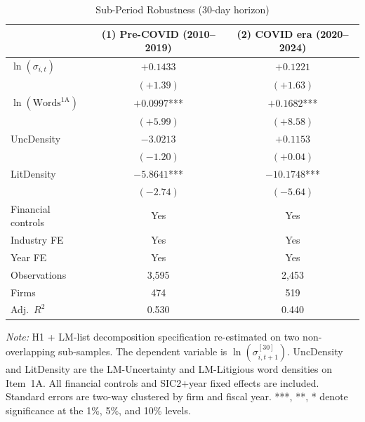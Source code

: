 \begin{table}[htbp]
\centering
\caption{Sub-Period Robustness (30-day horizon)}
\label{tab:subperiod}
\begin{tabular}{lcc}
\toprule
 & (1) Pre-COVID (2010--2019) & (2) COVID era (2020--2024) \\
\midrule
$\ln(\sigma_{i,t})$ & $+0.1433$ & $+0.1221$ \\
 & $(+1.39)$ & $(+1.63)$ \\[4pt]
$\ln(\text{Words}^{\text{1A}})$ & $+0.0997$*** & $+0.1682$*** \\
 & $(+5.99)$ & $(+8.58)$ \\[4pt]
UncDensity & $-3.0213$ & $+0.1153$ \\
 & $(-1.20)$ & $(+0.04)$ \\[4pt]
LitDensity & $-5.8641$*** & $-10.1748$*** \\
 & $(-2.74)$ & $(-5.64)$ \\[4pt]
\midrule
Financial controls & Yes & Yes \\
Industry FE & Yes & Yes \\
Year FE & Yes & Yes \\
Observations & 3,595 & 2,453 \\
Firms & 474 & 519 \\
Adj.\ $R^2$ & 0.530 & 0.440 \\
\bottomrule
\end{tabular}
\par\smallskip
\noindent\footnotesize 
\textit{Note:} H1 + LM-list decomposition specification re-estimated on two non-overlapping sub-samples. The dependent variable is $\ln(\sigma_{i,t+1}^{[30]})$. UncDensity and LitDensity are the LM-Uncertainty and LM-Litigious word densities on Item~1A. All financial controls and SIC2$+$year fixed effects are included. Standard errors are two-way clustered by firm and fiscal year. ***, **, * denote significance at the 1\%, 5\%, and 10\% levels.
\end{table}